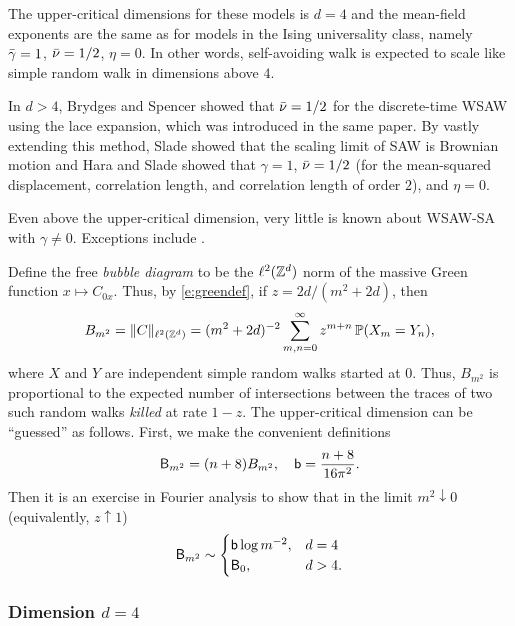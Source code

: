 The upper-critical dimensions for these models is $d = 4$ and the mean-field
exponents are the same as for models in the Ising universality class, namely
$\bar\gamma=1$, $\bar\nu = 1/2$, $\eta = 0$. In other words, self-avoiding walk
is expected to scale like simple random walk in dimensions above $4$.

In $d > 4$, Brydges and Spencer \cite{BS85} showed that $\bar\nu = 1/2$ for the
discrete-time WSAW using the lace expansion, which was introduced in the same paper.
By vastly extending this method, Slade \cite{Slad88} showed that the scaling limit
of SAW is Brownian motion and Hara and Slade \cite{HS92a,HS92b} showed that
$\gamma = 1$, $\bar\nu = 1/2$ (for the mean-squared displacement, correlation length,
and correlation length of order $2$), and $\eta = 0$.

Even above the upper-critical dimension, very little is known about WSAW-SA with
$\gamma \ne 0$. Exceptions include \cite{HH17,Uelt02}.

\begin{rk}
\label{rk:bubble}
Define the free \emph{bubble diagram} to be the $\ell^2({ {{\mathbb Z}}^d })$ norm of the massive
Green function $x \mapsto C_{0x}$. Thus, by
\eqref{e:greendef}, if $z = 2 d / (m^2 + 2 d)$, then
\begin{equation}
\label{e:bubble-def}
B_{m^2}
	=
\|C\|_{\ell^2({ {{\mathbb Z}}^d })}
	=
(m^2 + 2 d)^{-2} \sum_{m,n=0}^\infty z^{m+n} \operatorname{\mathbb{P}}(X_m = Y_n),
\end{equation}
where $X$ and $Y$ are independent simple random walks started at $0$. Thus, $B_{m^2}$
is proportional to the expected number of intersections between the traces of two
such random walks \emph{killed} at rate $1 - z$. The upper-critical dimension can
be ``guessed'' as follows. First, we make the convenient definitions
\begin{equation}
\label{e:bubble}
{\sf B}_{m^2} = (n + 8) B_{m^2},
	\quad
{\sf b} = \frac{n + 8}{16\pi^2}.
\end{equation}
Then it is an exercise in Fourier analysis to show that in the limit $m^2\downarrow0$
(equivalently, $z\uparrow1$)
\begin{equation}
\label{e:bubble-log}
{\sf B}_{m^2}
	\sim
\begin{cases}
{\sf b} \log m^{-2},
	&
d = 4
	\\
{\sf B}_0,
	&
d > 4.
\end{cases}
\end{equation}
\end{rk}

\subsubsection{Dimension $d = 4$}

